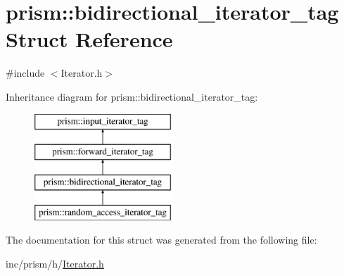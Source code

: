 \hypertarget{structprism_1_1bidirectional__iterator__tag}{}\section{prism\+:\+:bidirectional\+\_\+iterator\+\_\+tag Struct Reference}
\label{structprism_1_1bidirectional__iterator__tag}


{\ttfamily \#include $<$Iterator.\+h$>$}

Inheritance diagram for prism\+:\+:bidirectional\+\_\+iterator\+\_\+tag\+:\begin{figure}[H]
\begin{center}
\leavevmode
\includegraphics[height=4.000000cm]{structprism_1_1bidirectional__iterator__tag}
\end{center}
\end{figure}


The documentation for this struct was generated from the following file\+:\begin{DoxyCompactItemize}
\item 
inc/prism/h/\hyperlink{_iterator_8h}{Iterator.\+h}\end{DoxyCompactItemize}
